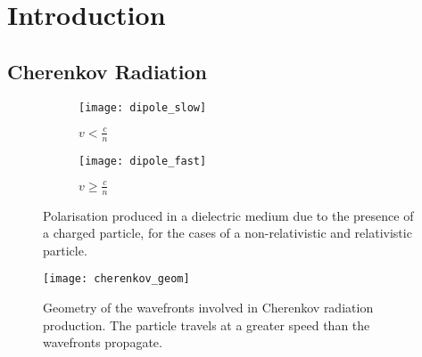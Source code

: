 \chapter{\label{ch1-intro}Introduction} 

\minitoc

\section{Cherenkov Radiation}

\begin{figure}
  \begin{subfigure}[b]{0.49\textwidth}
    \texttt{[image: dipole\_slow]}
    \caption{$v < \frac{c}{n}$}
    \label{fig:dipole_slow}
  \end{subfigure}
  \hfill
  \begin{subfigure}[b]{0.49\textwidth}
    \texttt{[image: dipole\_fast]}
    \caption{$v \ge \frac{c}{n}$}
    \label{fig:dipole_fast}
  \end{subfigure}
  \caption[Polarisation produced in a dielectric medium due to the presence of a charged particle.]{Polarisation produced in a dielectric medium due to the presence of a charged particle, for the cases of a non-relativistic and relativistic particle.}
\end{figure}

\begin{figure}
	\centering\texttt{[image: cherenkov\_geom]} 
	\caption[Geometry of the wavefronts involved in Cherenkov radiation production.]{Geometry of the wavefronts involved in Cherenkov radiation production. The particle travels at a greater speed than the wavefronts propagate.}
	\label{fig:cherenkov_geom}
\end{figure}

